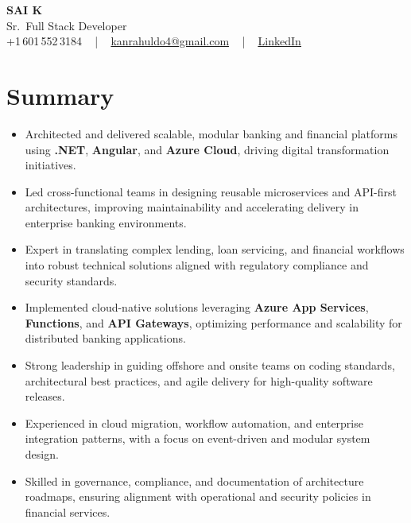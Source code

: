 \documentclass[letterpaper,11pt]{article}
\newcommand{\resumeItem}[1]{
  \item\footnotesize{
    {#1 \vspace{-2pt}}
  }
}
\newcommand{\resumeItemListStart}{\begin{itemize}[leftmargin=*]}
\newcommand{\resumeItemListEnd}{\end{itemize}\vspace{-5pt}}
\begin{document}
\begin{center}
    {\fontsize{14pt}{12pt}\selectfont \textbf{\MakeUppercase{Sai K}}}\\ \vspace{2pt}
    \fontsize{10pt}{12pt}\selectfont Sr.\ Full Stack Developer\\ \vspace{2pt}
    \fontsize{10pt}{12pt}\selectfont +1\,601\,552\,3184 ~ | ~
    \href{mailto:kanrahuldo4@gmail.com}{kanrahuldo4@gmail.com} ~ | ~
    \href{https://www.linkedin.com/in/srrrk/}{\color{blue}\underline{LinkedIn}}
    \vspace{-10pt}
\end{center}

\section{Summary}
\fontsize{9pt}{10pt}\selectfont
\resumeItemListStart
  \resumeItem{Architected and delivered scalable, modular banking and financial platforms using \textbf{.NET}, \textbf{Angular}, and \textbf{Azure Cloud}, driving digital transformation initiatives.}
  \resumeItem{Led cross-functional teams in designing reusable microservices and API-first architectures, improving maintainability and accelerating delivery in enterprise banking environments.}
  \resumeItem{Expert in translating complex lending, loan servicing, and financial workflows into robust technical solutions aligned with regulatory compliance and security standards.}
  \resumeItem{Implemented cloud-native solutions leveraging \textbf{Azure App Services}, \textbf{Functions}, and \textbf{API Gateways}, optimizing performance and scalability for distributed banking applications.}
  \resumeItem{Strong leadership in guiding offshore and onsite teams on coding standards, architectural best practices, and agile delivery for high-quality software releases.}
  \resumeItem{Experienced in cloud migration, workflow automation, and enterprise integration patterns, with a focus on event-driven and modular system design.}
  \resumeItem{Skilled in governance, compliance, and documentation of architecture roadmaps, ensuring alignment with operational and security policies in financial services.}
\resumeItemListEnd
\vspace{-6pt}

\end{document}
